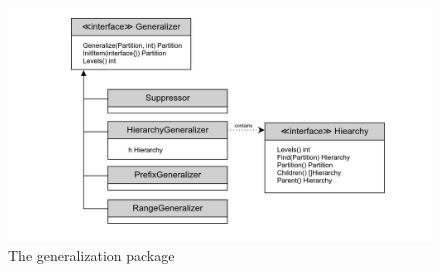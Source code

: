 \begin{figure}
    \centering
    \includegraphics[width=\textwidth]{images/lib-generalizer.png}
    \caption{The generalization package}\label{fig:generalization_package}
\end{figure}
